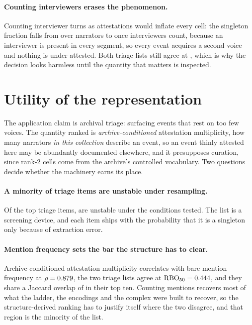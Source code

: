 \documentclass[conference]{IEEEtran}
\begin{document}
\paragraph{Counting interviewers erases the phenomenon.} Counting interviewer turns as
attestations would inflate every cell: the singleton fraction
falls from \singletonNarrators{} over narrators to \singletonWithInterviewers{} once
interviewers count, because an interviewer is present in every segment, so every event
acquires a second voice and nothing is under-attested. Both triage lists still agree at
\interviewerRbo{}, which is why the decision looks harmless until the quantity that matters
is inspected.

\section{Utility of the representation}

The application claim is archival triage: surfacing events that rest on too few voices. The
quantity ranked is \emph{archive-conditioned} attestation multiplicity, how many narrators
\emph{in this collection} describe an event, so an event thinly attested here may be
abundantly documented elsewhere, and it presupposes curation, since rank-2 cells come
from the
archive's controlled vocabulary. Two questions decide whether the machinery earns its place.

\paragraph{A minority of triage items are unstable under resampling.} Of the top \triageK{}
triage items, \triageUnstable{} are unstable under the conditions tested. The list is a
screening device, and each item ships with the probability that it is a singleton only
because of extraction error.

\paragraph{Mention frequency sets the bar the structure has to clear.} Archive-conditioned attestation
multiplicity correlates with bare mention frequency at $\rho = 0.879{}$, the two
triage lists agree at $\text{RBO}_{50} = 0.444{}$, and they share a Jaccard overlap of
\freqJaccard{} in their top ten. Counting mentions recovers most of what the ladder, the
encodings and the complex were built to recover, so the structure-derived ranking has to
justify itself where the two disagree, and that region is the minority of the list.
\end{document}
